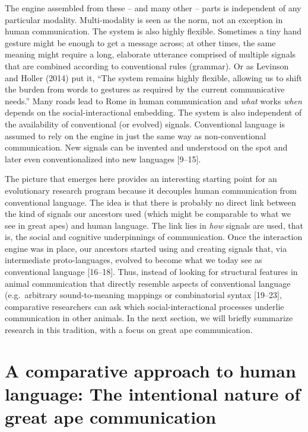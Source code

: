 \documentclass[
  english,
  man,floatsintext]{apa6}
\begin{document}
The engine assembled from these -- and many other -- parts is independent of any particular modality. Multi-modality is seen as the norm, not an exception in human communication. The system is also highly flexible. Sometimes a tiny hand gesture might be enough to get a message across; at other times, the same meaning might require a long, elaborate utterance comprised of multiple signals that are combined according to conventional rules (grammar). Or as Levinson and Holler (2014) put it, ``The system remains highly flexible, allowing us to shift the burden from words to gestures as required by the current communicative needs.'' Many roads lead to Rome in human communication and \emph{what} works \emph{when} depends on the social-interactional embedding. The system is also independent of the availability of conventional (or evolved) signals. Conventional language is assumed to rely on the engine in just the same way as non-conventional communication. New signals can be invented and understood on the spot and later even conventionalized into new languages {[}9--15{]}.

The picture that emerges here provides an interesting starting point for an evolutionary research program because it decouples human communication from conventional language. The idea is that there is probably no direct link between the kind of signals our ancestors used (which might be comparable to what we see in great apes) and human language. The link lies in \emph{how} signals are used, that is, the social and cognitive underpinnings of communication. Once the interaction engine was in place, our ancestors started using and creating signals that, via intermediate proto-languages, evolved to become what we today see as conventional language {[}16--18{]}. Thus, instead of looking for structural features in animal communication that directly resemble aspects of conventional language (e.g.~arbitrary sound-to-meaning mappings or combinatorial syntax {[}19--23{]}, comparative researchers can ask which social-interactional processes underlie communication in other animals. In the next section, we will briefly summarize research in this tradition, with a focus on great ape communication.

\hypertarget{a-comparative-approach-to-human-language-the-intentional-nature-of-great-ape-communication}{%
\section{A comparative approach to human language: The intentional nature of great ape communication}\label{a-comparative-approach-to-human-language-the-intentional-nature-of-great-ape-communication}}
\end{document}
